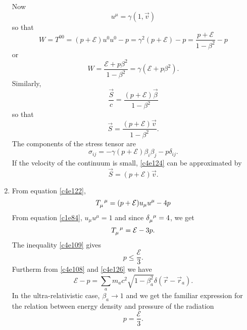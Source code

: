 \begin{enumerate}
Now 
\[
u^\mu = \gamma(1, \vec{v})
\]
so that
\[
W = T^{00} = (p + \mathcal{E})u^0 u^0 - p = \gamma^2(p + \mathcal{E}) - p
= \frac{p + \mathcal{E}}{1 - \beta^2} - p
\]
or
\begin{equation}\label{c4e123}
W = \frac{\mathcal{E} + p\beta^2}{1 - \beta^2} = \gamma(\mathcal{E} + p\beta^2).
\end{equation}
Similarly,
\[
\frac{\vec{S}}{c} = \frac{(p + \mathcal{E})\vec{\beta}}{1 - \beta^2}
\]
so that
\begin{equation}\label{c4e124}
\vec{S} = \frac{(p + \mathcal{E})\vec{v}}{1 - \beta^2}.
\end{equation}
The components of the stress tensor are
\begin{equation}\label{c4e125}
\sigma_{ij} = -\gamma(p + \mathcal{E})\beta_i\beta_j - p\delta_{ij}.
\end{equation}
If the velocity of the continuum is small, \eqref{c4e124} can be approximated by
\begin{equation}
\vec{S} = (p + \mathcal{E})\vec{v}.
\end{equation}

\item From equation \eqref{c4e122},
\[
\tensor{T}{_\mu^\mu} = (p + \mathcal{E})u_\mu u^\mu - 4p
\]
From equation \eqref{c1e84}, $u_\mu u^\mu = 1$ and since $\tensor{\delta}
{_\mu^\mu} = 4$, we get
\begin{equation}\label{c4e126}
\tensor{T}{_\mu^\mu} = \mathcal{E} - 3p.
\end{equation}
The inequality \eqref{c4e109} gives
\begin{equation}\label{c4e127}
p \le \frac{\mathcal{E}}{3}.
\end{equation}
Furtherm from \eqref{c4e108} and \eqref{c4e126} we have
\begin{equation}\label{c4e128}
\mathcal{E} - p = \sum_a m_ac^2\sqrt{1 - \beta_a^2}\delta(\vec{r} - \vec{r}_a).
\end{equation}
In the ultra-relativistic case, $\beta_a \rightarrow 1$ and we get the familiar
expression for the relation between energy density and pressure of the radiation
\begin{equation}\label{c4e129}
p = \frac{\mathcal{E}}{3}.
\end{equation}

\end{enumerate}

